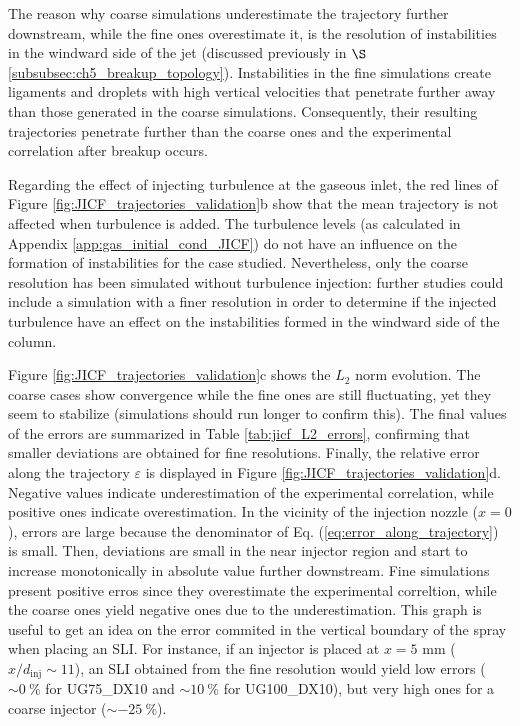 \vspace*{-0.05in}

The reason why coarse simulations underestimate the trajectory further downstream, while the fine ones overestimate it, is the resolution of instabilities in the windward side of the jet (discussed previously in $\S$\ref{subsubsec:ch5_breakup_topology}).  Instabilities in the fine simulations create ligaments and droplets with high vertical velocities that penetrate further away than those generated in the coarse simulations. Consequently, their resulting trajectories penetrate further than the coarse ones and the experimental correlation after breakup occurs. 


Regarding the effect of injecting turbulence at the gaseous inlet, the red lines of Figure \ref{fig:JICF_trajectories_validation}b show that the mean trajectory is not affected when turbulence is added. The turbulence levels (as calculated in Appendix \ref{app:gas_initial_cond_JICF}) do not have an influence on the formation of instabilities for the case studied. Nevertheless, only the coarse resolution has been simulated without turbulence injection: further studies could include a simulation with a finer resolution in order to determine if the injected turbulence have an effect on the instabilities formed in the windward side of the column.

Figure \ref{fig:JICF_trajectories_validation}c shows the $L_2$ norm evolution. The coarse cases show convergence while the fine ones are still fluctuating, yet they seem to stabilize (simulations should run longer to confirm this). The final values of the errors are summarized in Table \ref{tab:jicf_L2_errors}, confirming that smaller deviations are obtained for fine resolutions. Finally, the relative error along the trajectory $\varepsilon$ is displayed in Figure \ref{fig:JICF_trajectories_validation}d. Negative values indicate underestimation of the experimental correlation, while positive ones indicate overestimation. In the vicinity of the injection nozzle ($x = 0$), errors are large because the denominator of Eq. (\ref{eq:error_along_trajectory}) is small. Then, deviations are small in the near injector region and start to increase monotonically in absolute value further downstream. Fine simulations present positive erros since they overestimate the experimental correltion, while the coarse ones yield negative ones due to the underestimation. This graph is useful to get an idea on the error commited in the vertical boundary of the spray when placing an SLI. For instance, if an injector is placed at $x = 5$ mm ($x/d_\mathrm{inj} \sim 11$), an SLI obtained from the fine resolution would yield low errors ($\sim 0~\%$ for UG75\_DX10 and $\sim 10~\%$ for UG100\_DX10), but very high ones for a coarse injector ($\sim - 25~\%$). %



